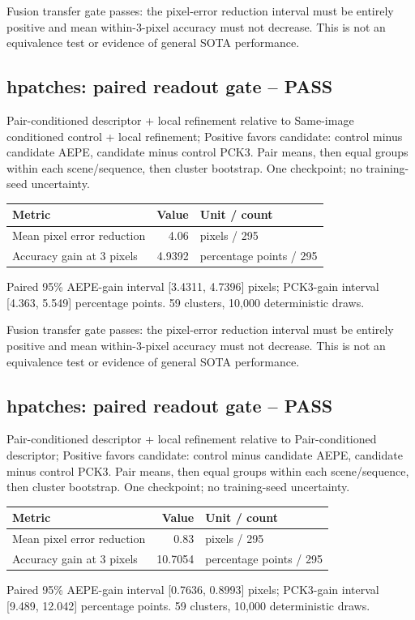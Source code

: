 \documentclass[10pt]{article}
\begin{document}
Fusion transfer gate passes: the pixel-error reduction interval must be entirely positive and mean within-3-pixel accuracy must not decrease. This is not an equivalence test or evidence of general SOTA performance.

\subsection{hpatches: paired readout gate -- PASS}
Pair-conditioned descriptor + local refinement relative to Same-image conditioned control + local refinement; Positive favors candidate: control minus candidate AEPE, candidate minus control PCK3. Pair means, then equal groups within each scene/sequence, then cluster bootstrap. One checkpoint; no training-seed uncertainty.
\begin{center}\begin{tabular}{p{.57\linewidth}rp{.23\linewidth}}\toprule Metric & Value & Unit / count \\ \midrule
Mean pixel error reduction & 4.06 & pixels / 295 \\
Accuracy gain at 3 pixels & 4.9392 & percentage points / 295 \\
\bottomrule\end{tabular}\end{center}
Paired 95\% AEPE-gain interval [3.4311, 4.7396] pixels; PCK3-gain interval [4.363, 5.549] percentage points. 59 clusters, 10,000 deterministic draws.

Fusion transfer gate passes: the pixel-error reduction interval must be entirely positive and mean within-3-pixel accuracy must not decrease. This is not an equivalence test or evidence of general SOTA performance.

\subsection{hpatches: paired readout gate -- PASS}
Pair-conditioned descriptor + local refinement relative to Pair-conditioned descriptor; Positive favors candidate: control minus candidate AEPE, candidate minus control PCK3. Pair means, then equal groups within each scene/sequence, then cluster bootstrap. One checkpoint; no training-seed uncertainty.
\begin{center}\begin{tabular}{p{.57\linewidth}rp{.23\linewidth}}\toprule Metric & Value & Unit / count \\ \midrule
Mean pixel error reduction & 0.83 & pixels / 295 \\
Accuracy gain at 3 pixels & 10.7054 & percentage points / 295 \\
\bottomrule\end{tabular}\end{center}
Paired 95\% AEPE-gain interval [0.7636, 0.8993] pixels; PCK3-gain interval [9.489, 12.042] percentage points. 59 clusters, 10,000 deterministic draws.
\end{document}
